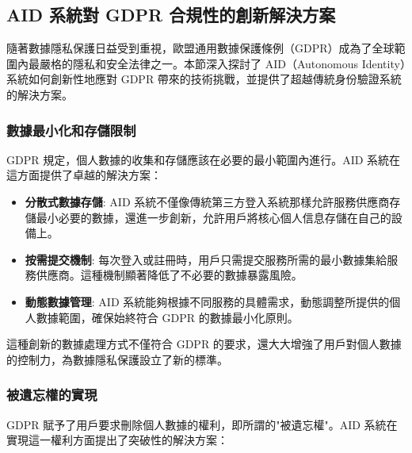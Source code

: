 \subsection{AID 系統對 GDPR 合規性的創新解決方案}

隨著數據隱私保護日益受到重視，歐盟通用數據保護條例（GDPR）成為了全球範圍內最嚴格的隱私和安全法律之一。本節深入探討了 AID（Autonomous Identity）系統如何創新性地應對 GDPR 帶來的技術挑戰，並提供了超越傳統身份驗證系統的解決方案。

\subsubsection{數據最小化和存儲限制}

GDPR 規定，個人數據的收集和存儲應該在必要的最小範圍內進行。AID 系統在這方面提供了卓越的解決方案：

\begin{itemize}
  \item \textbf{分散式數據存儲}: AID 系統不僅像傳統第三方登入系統那樣允許服務供應商存儲最小必要的數據，還進一步創新，允許用戶將核心個人信息存儲在自己的設備上。

  \item \textbf{按需提交機制}: 每次登入或註冊時，用戶只需提交服務所需的最小數據集給服務供應商。這種機制顯著降低了不必要的數據暴露風險。

  \item \textbf{動態數據管理}: AID 系統能夠根據不同服務的具體需求，動態調整所提供的個人數據範圍，確保始終符合 GDPR 的數據最小化原則。
\end{itemize}

這種創新的數據處理方式不僅符合 GDPR 的要求，還大大增強了用戶對個人數據的控制力，為數據隱私保護設立了新的標準。

\subsubsection{被遺忘權的實現}

GDPR 賦予了用戶要求刪除個人數據的權利，即所謂的"被遺忘權"。AID 系統在實現這一權利方面提出了突破性的解決方案：

